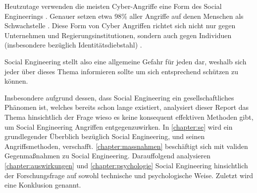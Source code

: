 Heutzutage verwenden die meisten Cyber-Angriffe eine Form des Social Engineerings .
Genauer setzen etwa 98\% aller Angriffe auf denen Menschen als Schwachstelle .
Diese Form von Cyber Angriffen richtet sich nicht nur gegen Unternehmen und Regierungsinstitutionen,
sondern auch gegen Individuen (insbesondere bezüglich Identitätsdiebstahl) .

Social Engineering stellt also eine allgemeine Gefahr für jeden dar, weshalb sich jeder über dieses
Thema informieren sollte um sich entsprechend schützen zu können.

Insbesondere aufgrund dessen, dass Social Engineering ein gesellschaftliches Phänomen ist, welches bereits
schon lange existiert, analysiert dieser Report das Thema hinsichtlich der Frage wieso es keine konsequent effektiven
Methoden gibt, um Social Engineering Angriffen entgegenzuwirken.
In \autoref{chapter:se} wird ein grundlegender Überblich bezüglich Social Engineering, und seinen Angriffsmethoden, verschafft.
\autoref{chapter:massnahmen} beschäftigt sich mit validen Gegenmaßnahmen zu Social Engineering.
Darauffolgend analysieren \autoref{chapter:auswirkungen} und \autoref{chapter:psychologie} Social Engineering hinsichtlich der
Forschungsfrage auf sowohl technische und psychologische Weise. Zuletzt wird eine Konklusion genannt.

